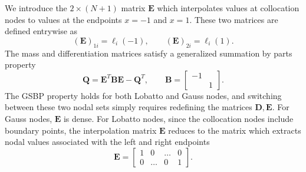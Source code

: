 \documentclass{svjour3}                     %
\newcommand{\LRp}[1]{\left( #1 \right)}
\begin{document}
We introduce the $2\times (N+1)$ matrix $\bm{E}$ which interpolates values at collocation nodes to values at the endpoints $x = -1$ and $x=1$.  These two matrices are defined entrywise as
\[
\LRp{\bm{E}}_{1i} = \ell_i(-1), \qquad  \LRp{\bm{E}}_{2i} = \ell_i(1).
\]
The mass and differentiation matrices satisfy a generalized summation by parts property \cite{fernandez2014generalized}
\begin{equation}
\bm{Q} = \bm{E}^T \bm{B} \bm{E} - \bm{Q}^T, \qquad \bm{B} = \begin{bmatrix}-1 & \\ & 1\end{bmatrix}.
\label{eq:gsbp}
\end{equation}
The GSBP property holds for both Lobatto and Gauss nodes, and switching between these two nodal sets simply requires redefining the matrices $\bm{D}, \bm{E}$.  For Gauss nodes, $\bm{E}$ is dense.  For Lobatto nodes, since the collocation nodes include boundary points, the interpolation matrix $\bm{E}$ reduces to the matrix which extracts nodal values associated with the left and right endpoints
\[
\bm{E} = \begin{bmatrix}
1 & 0 & \ldots & 0\\
0 & \ldots & 0 & 1
\end{bmatrix}.
\]
\end{document}
